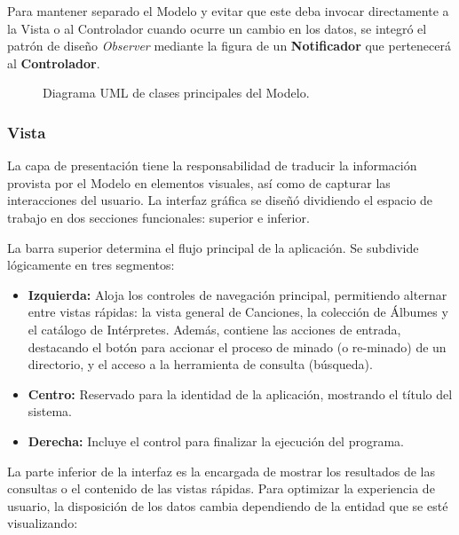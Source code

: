 \documentclass{rep}
\begin{document}
    Para mantener separado el Modelo y evitar que este deba invocar
    directamente a la Vista o al Controlador cuando ocurre un cambio
    en los datos, se integró el patrón de diseño \textit{Observer}
    mediante la figura de un \textbf{Notificador} que pertenecerá al
    \textbf{Controlador}.

    \begin{figure}[htbp]
      \centering
        
        \caption{Diagrama UML de clases principales del Modelo.}
        \label{fig:Modelo}
    \end{figure}

    \subsubsection{Vista}
    
    La capa de presentación tiene la responsabilidad de traducir la
    información provista por el Modelo en elementos visuales, así como
    de capturar las interacciones del usuario. La interfaz gráfica se
    diseñó dividiendo el espacio de trabajo en dos secciones
    funcionales: superior e inferior.

    La barra superior determina el flujo principal de la
    aplicación. Se subdivide lógicamente en tres segmentos:

    \begin{itemize}
    \item \textbf{Izquierda:} Aloja los controles de navegación
      principal, permitiendo alternar entre vistas rápidas: la vista
      general de Canciones, la colección de Álbumes y el catálogo de
      Intérpretes. Además, contiene las acciones de entrada,
      destacando el botón para accionar el proceso de minado (o
      re-minado) de un directorio, y el acceso a la herramienta de
      consulta (búsqueda).
    \item \textbf{Centro:} Reservado para la identidad de la
      aplicación, mostrando el título del sistema.
    \item \textbf{Derecha:} Incluye el control para finalizar la
      ejecución del programa.
    \end{itemize}

    La parte inferior de la interfaz es la encargada de mostrar los
    resultados de las consultas o el contenido de las vistas
    rápidas. Para optimizar la experiencia de usuario, la disposición
    de los datos cambia dependiendo de la entidad que se esté
    visualizando:
    
\end{document}
